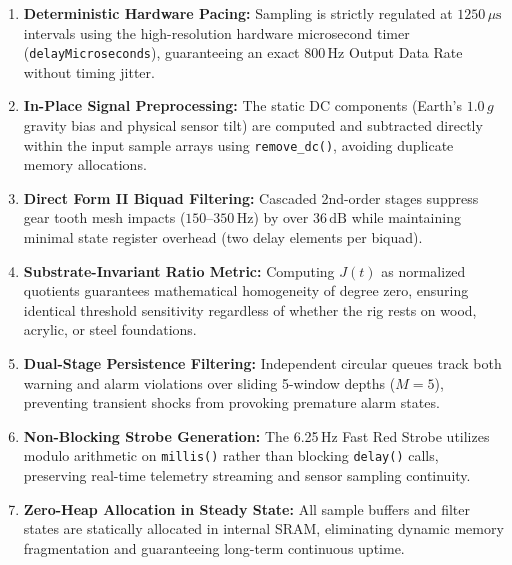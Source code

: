 \begin{enumerate}
    \item \textbf{Deterministic Hardware Pacing:} Sampling is strictly regulated at $1250\,\mu\text{s}$ intervals using the high-resolution hardware microsecond timer (\texttt{delayMicroseconds}), guaranteeing an exact 800\,Hz Output Data Rate without timing jitter.
    \item \textbf{In-Place Signal Preprocessing:} The static DC components (Earth's $1.0\,g$ gravity bias and physical sensor tilt) are computed and subtracted directly within the input sample arrays using \texttt{remove\_dc()}, avoiding duplicate memory allocations.
    \item \textbf{Direct Form II Biquad Filtering:} Cascaded 2nd-order stages suppress gear tooth mesh impacts ($150\text{--}350\,\text{Hz}$) by over $36\,\text{dB}$ while maintaining minimal state register overhead (two delay elements per biquad).
    \item \textbf{Substrate-Invariant Ratio Metric:} Computing $J(t)$ as normalized quotients guarantees mathematical homogeneity of degree zero, ensuring identical threshold sensitivity regardless of whether the rig rests on wood, acrylic, or steel foundations.
    \item \textbf{Dual-Stage Persistence Filtering:} Independent circular queues track both warning and alarm violations over sliding 5-window depths ($M=5$), preventing transient shocks from provoking premature alarm states.
    \item \textbf{Non-Blocking Strobe Generation:} The 6.25\,Hz Fast Red Strobe utilizes modulo arithmetic on \texttt{millis()} rather than blocking \texttt{delay()} calls, preserving real-time telemetry streaming and sensor sampling continuity.
    \item \textbf{Zero-Heap Allocation in Steady State:} All sample buffers and filter states are statically allocated in internal SRAM, eliminating dynamic memory fragmentation and guaranteeing long-term continuous uptime.
\end{enumerate}
\clearpage
